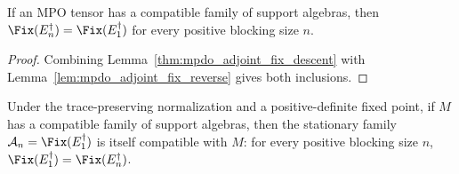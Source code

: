 \begin{lemma}%
    \label{thm:mpdo_adjoint_fix_equality_from_algebra}
    \leanok
    If an MPO tensor has a compatible family of support algebras, then
    $\Fix(E_n^{\dagger})=\Fix(E_1^{\dagger})$ for every positive blocking
    size $n$.
\end{lemma}
\begin{proof}\leanok
    Combining Lemma~\ref{thm:mpdo_adjoint_fix_descent} with
    Lemma~\ref{lem:mpdo_adjoint_fix_reverse} gives both inclusions.
\end{proof}

\begin{lemma}%
    \label{thm:mpdo_stationary_tower_from_algebra}
    \leanok
    Under the trace-preserving normalization and a positive-definite fixed
    point, if $M$ has a compatible family of support algebras, then the
    stationary family $\mathcal{A}_n = \Fix(E_1^\dagger)$ is
    itself compatible with $M$: for every positive blocking size $n$,
    $\Fix(E_1^\dagger)=\Fix(E_n^\dagger)$.
\end{lemma}

